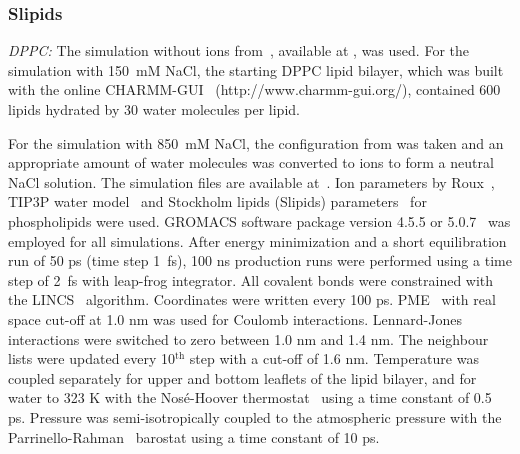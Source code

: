 \documentclass[twoside,twocolumn,9pt]{article}
\begin{document}
\subsubsection{Slipids}
{\it DPPC:} The simulation without ions from~\cite{botan15}, available at \cite{slipidsFILES}, was used. 
For the simulation with 150~mM NaCl, the starting DPPC lipid bilayer, which was built with the online CHARMM-GUI~\cite{lee15}
(http://www.charmm-gui.org/), contained 600 lipids hydrated by 30 water molecules per lipid. 

For the simulation with 850~mM NaCl, the configuration from  \cite{slipidsFILES} was taken and 
an appropriate amount of water molecules was converted to ions to form a neutral NaCl solution. 
The simulation files are available at~\cite{slipidsFILESdppc}. 
%
Ion parameters by Roux~\cite{beglov94,roux96}, TIP3P water model~\cite{jorgensen83} and 
Stockholm lipids (Slipids) parameters~\cite{jambeck12,jambeck12b} for phospholipids were used. 
GROMACS software package version 4.5.5 or 5.0.7~\cite{pronk13} was employed for all simulations. 
After energy 
minimization and a short equilibration run of 50 ps (time step 1~fs), 100 ns production runs were performed using 
a time step of 2~fs with leap-frog integrator. All covalent bonds were constrained with the LINCS~\cite{hess97,hess07}
algorithm. Coordinates were written every 100 ps. PME~\cite{darden93,essman95} with real space cut-off at 1.0 nm was used for Coulomb 
interactions. Lennard-Jones interactions were switched to zero between 1.0 nm and 1.4 nm. The neighbour 
lists were updated every 10$^\mathrm{th}$ step with a cut-off of 1.6 nm. Temperature was coupled separately for upper and 
bottom leaflets of the lipid bilayer, and for water to 323 K with the Nos\'e-Hoover thermostat~\cite{nose84,hoover85} using 
a time constant of 0.5 ps. Pressure was semi-isotropically coupled to the atmospheric pressure 
with the Parrinello-Rahman~\cite{parrinello81} barostat using a time constant of 10 ps.
\end{document}
